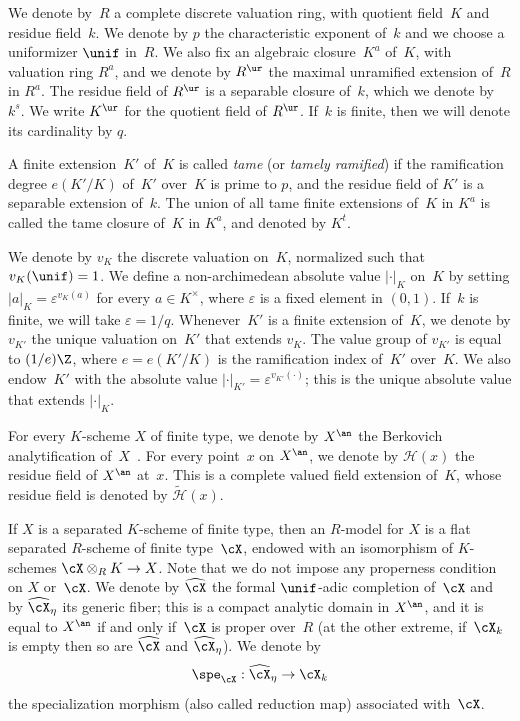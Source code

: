 We denote by~$R$ a complete discrete valuation ring, with quotient field~$K$ and residue field~$k$. We denote by $p$ the characteristic exponent of~$k$ and we choose a uniformizer $\unif$ in~$R$. We also fix an algebraic closure~$K^a$ of~$K$, with valuation ring $R^a$, and we denote by $R^{\ur}$ the maximal unramified extension of~$R$ in $R^{a}$.
The residue field of $R^{\ur}$ is a separable closure of~$k$, which we denote by~$k^s$. We write $K^{\ur}$ for the quotient field of $R^{\ur}$.
If~$k$ is finite, then we will denote its cardinality
by $q$.

A finite extension~$K'$ of~$K$ is called {\em tame} (or {\em tamely ramified}) if the ramification degree $e(K'/K)$ of~$K'$ over~$K$ is prime to $p$, and the residue field of
$K'$ is a separable extension of~$k$. The union of all tame finite extensions of~$K$ in $K^a$ is called the tame closure of~$K$ in $K^a$, and denoted by $K^t$.

We denote by $v_K$ the discrete valuation on~$K$, normalized such that $v_K(\unif)=1$. We define a non-archimedean absolute value $|\cdot|_K$ on~$K$ by setting
$|a|_K=\varepsilon^{v_K(a)}$ for every $a\in K^{\times}$, where $\varepsilon$ is a fixed element in $(0,1)$. If~$k$ is finite, we will take $\varepsilon=1/q$. Whenever~$K'$ is a finite extension of~$K$, we denote by $v_{K'}$ the unique valuation on~$K'$ that extends $v_K$. The value group of $v_{K'}$ is equal to $(1/e)\Z$, where $e=e(K'/K)$ is the ramification index of~$K'$ over~$K$.
We also endow~$K'$ with the absolute value $|\cdot|_{K'}=\varepsilon^{v_{K'}(\cdot)}$; this is the unique absolute value that extends $|\cdot|_K$.

For every $K$\nobreakdash-scheme $X$ of finite type, we denote by $X^{\an}$ the Berkovich analytification of~$X$~\cite{berk}. For every point~$x$ on $X^{\an}$, we denote by $\mathscr{H}(x)$ the residue field of $X^{\an}$ at~$x$. This is a complete valued field extension of~$K$, whose residue field is denoted by $\widetilde{\mathscr{H}}(x)$.

If $X$ is a separated $K$\nobreakdash-scheme of finite type, then an $R$\nobreakdash-model for $X$ is a flat separated $R$\nobreakdash-scheme of finite type~$\cX$, endowed with an isomorphism of $K$\nobreakdash-schemes $\cX\otimes_R K\to X$. Note that we do not impose any properness condition on $X$ or~$\cX$. We denote by $\widehat{\cX}$ the formal $\unif$-adic completion of~$\cX$ and by
$\widehat{\cX}_\eta$ its generic fiber; this is a compact analytic domain in $X^{\an}$, and it is equal to $X^{\an}$ if and only if~$\cX$ is proper over~$R$ (at the other extreme, if~$\cX_k$ is empty then so are $\widehat{\cX}$ and $\widehat{\cX}_\eta$). We denote by
\[
\spe_{\cX}:\widehat{\cX}_\eta\to \cX_k
\]
the specialization morphism (also called reduction map) associated with~$\cX$.

